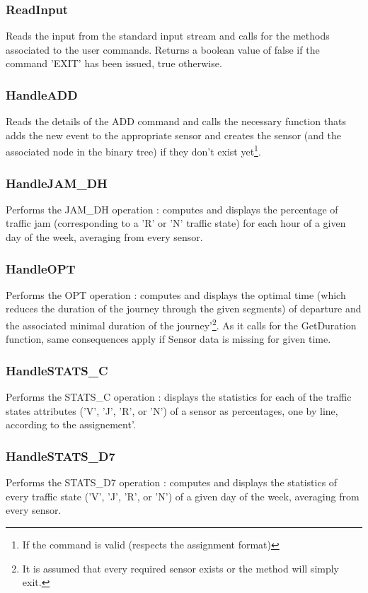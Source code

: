 \documentclass[10pt]{article}
\begin{document}
\subsubsection*{ReadInput}
Reads the input from the standard input stream and calls for the methods associated to the user commands. Returns a boolean value of false if the command 'EXIT' has been issued, true otherwise.

\subsubsection*{HandleADD}
Reads the details of the ADD command and calls the necessary function thats adds the new event to the appropriate sensor and creates the sensor (and the associated node in the binary tree) if they don't exist yet\footnote{ If the command is valid (respects the assignment format)}.

\subsubsection*{HandleJAM\_DH}
Performs the JAM\_DH operation : computes and displays the percentage of traffic jam (corresponding to a 'R' or 'N' traffic state) for each hour of a given day of the week, averaging from every sensor\footnotemark[2].

\subsubsection*{HandleOPT}
Performs the OPT operation : computes and displays the optimal time (which reduces the duration of the journey through the given segments) of departure and the associated minimal duration of the journey\footnotemark[2]'\footnote{ It is assumed that every required sensor exists or the method will simply exit.}. As it calls for the GetDuration function, same consequences apply if Sensor data is missing for given time.

\subsubsection*{HandleSTATS\_C}
Performs the STATS\_C operation : displays the statistics for each of the traffic states attributes ('V', 'J', 'R', or 'N') of a sensor as percentages, one by line, according to the assignement\footnotemark[2]'\footnotemark[3].

\subsubsection*{HandleSTATS\_D7}
Performs the STATS\_D7 operation : computes and displays the statistics of every traffic state ('V', 'J', 'R', or 'N') of a given day of the week, averaging from every sensor\footnotemark[2].
\end{document}
